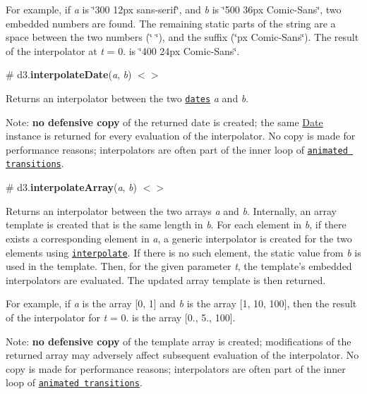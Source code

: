 For example, if {\itshape a} is {\ttfamily \char`\"{}300 12px sans-\/serif\char`\"{}}, and {\itshape b} is {\ttfamily \char`\"{}500 36px Comic-\/\+Sans\char`\"{}}, two embedded numbers are found. The remaining static parts of the string are a space between the two numbers ({\ttfamily \char`\"{} \char`\"{}}), and the suffix ({\ttfamily \char`\"{}px Comic-\/\+Sans\char`\"{}}). The result of the interpolator at {\itshape t} = 0. is {\ttfamily \char`\"{}400 24px Comic-\/\+Sans\char`\"{}}.

\label{_interpolateDate}%
\# d3.{\bfseries interpolate\+Date}({\itshape a}, {\itshape b}) \href{https://github.com/d3/d3-interpolate/blob/master/src/date.js}{\tt $<$$>$}

Returns an interpolator between the two \href{https://developer.mozilla.org/en-US/docs/Web/JavaScript/Reference/Global_Objects/Date}{\tt dates} {\itshape a} and {\itshape b}.

Note\+: {\bfseries no defensive copy} of the returned date is created; the same \mbox{\hyperlink{classDate}{Date}} instance is returned for every evaluation of the interpolator. No copy is made for performance reasons; interpolators are often part of the inner loop of \href{https://github.com/d3/d3-transition}{\tt animated transitions}.

\label{_interpolateArray}%
\# d3.{\bfseries interpolate\+Array}({\itshape a}, {\itshape b}) \href{https://github.com/d3/d3-interpolate/blob/master/src/array.js}{\tt $<$$>$}

Returns an interpolator between the two arrays {\itshape a} and {\itshape b}. Internally, an array template is created that is the same length in {\itshape b}. For each element in {\itshape b}, if there exists a corresponding element in {\itshape a}, a generic interpolator is created for the two elements using \href{#interpolate}{\tt interpolate}. If there is no such element, the static value from {\itshape b} is used in the template. Then, for the given parameter {\itshape t}, the template’s embedded interpolators are evaluated. The updated array template is then returned.

For example, if {\itshape a} is the array {\ttfamily \mbox{[}0, 1\mbox{]}} and {\itshape b} is the array {\ttfamily \mbox{[}1, 10, 100\mbox{]}}, then the result of the interpolator for {\itshape t} = 0. is the array {\ttfamily \mbox{[}0., 5., 100\mbox{]}}.

Note\+: {\bfseries no defensive copy} of the template array is created; modifications of the returned array may adversely affect subsequent evaluation of the interpolator. No copy is made for performance reasons; interpolators are often part of the inner loop of \href{https://github.com/d3/d3-transition}{\tt animated transitions}.

